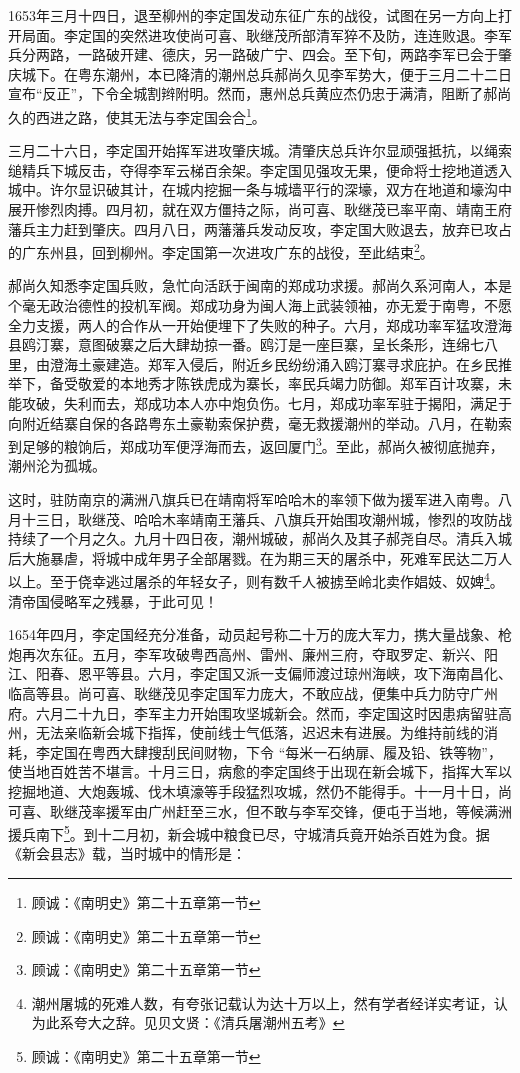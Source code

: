 1653年三月十四日，退至柳州的李定国发动东征广东的战役，试图在另一方向上打开局面。李定国的突然进攻使尚可喜、耿继茂所部清军猝不及防，连连败退。李军兵分两路，一路破开建、德庆，另一路破广宁、四会。至下旬，两路李军已会于肇庆城下。在粤东潮州，本已降清的潮州总兵郝尚久见李军势大，便于三月二十二日宣布“反正”，下令全城割辫附明。然而，惠州总兵黄应杰仍忠于满清，阻断了郝尚久的西进之路，使其无法与李定国会合\footnote{顾诚：《南明史》第二十五章第一节}。

三月二十六日，李定国开始挥军进攻肇庆城。清肇庆总兵许尔显顽强抵抗，以绳索缒精兵下城反击，夺得李军云梯百余架。李定国见强攻无果，便命将士挖地道透入城中。许尔显识破其计，在城内挖掘一条与城墙平行的深壕，双方在地道和壕沟中展开惨烈肉搏。四月初，就在双方僵持之际，尚可喜、耿继茂已率平南、靖南王府藩兵主力赶到肇庆。四月八日，两藩藩兵发动反攻，李定国大败退去，放弃已攻占的广东州县，回到柳州。李定国第一次进攻广东的战役，至此结束\footnote{顾诚：《南明史》第二十五章第一节}。

郝尚久知悉李定国兵败，急忙向活跃于闽南的郑成功求援。郝尚久系河南人，本是个毫无政治德性的投机军阀。郑成功身为闽人海上武装领袖，亦无爱于南粤，不愿全力支援，两人的合作从一开始便埋下了失败的种子。六月，郑成功率军猛攻澄海县鸥汀寨，意图破寨之后大肆劫掠一番。鸥汀是一座巨寨，呈长条形，连绵七八里，由澄海土豪建造。郑军入侵后，附近乡民纷纷涌入鸥汀寨寻求庇护。在乡民推举下，备受敬爱的本地秀才陈铁虎成为寨长，率民兵竭力防御。郑军百计攻寨，未能攻破，失利而去，郑成功本人亦中炮负伤。七月，郑成功率军驻于揭阳，满足于向附近结寨自保的各路粤东土豪勒索保护费，毫无救援潮州的举动。八月，在勒索到足够的粮饷后，郑成功军便浮海而去，返回厦门\footnote{顾诚：《南明史》第二十五章第一节}。至此，郝尚久被彻底抛弃，潮州沦为孤城。

这时，驻防南京的满洲八旗兵已在靖南将军哈哈木的率领下做为援军进入南粤。八月十三日，耿继茂、哈哈木率靖南王藩兵、八旗兵开始围攻潮州城，惨烈的攻防战持续了一个月之久。九月十四日夜，潮州城破，郝尚久及其子郝尧自尽。清兵入城后大施暴虐，将城中成年男子全部屠戮。在为期三天的屠杀中，死难军民达二万人以上。至于侥幸逃过屠杀的年轻女子，则有数千人被掳至岭北卖作娼妓、奴婢\footnote{潮州屠城的死难人数，有夸张记载认为达十万以上，然有学者经详实考证，认为此系夸大之辞。见贝文贤：《清兵屠潮州五考》}。清帝国侵略军之残暴，于此可见！

1654年四月，李定国经充分准备，动员起号称二十万的庞大军力，携大量战象、枪炮再次东征。五月，李军攻破粤西高州、雷州、廉州三府，夺取罗定、新兴、阳江、阳春、恩平等县。六月，李定国又派一支偏师渡过琼州海峡，攻下海南昌化、临高等县。尚可喜、耿继茂见李定国军力庞大，不敢应战，便集中兵力防守广州府。六月二十九日，李军主力开始围攻坚城新会。然而，李定国这时因患病留驻高州，无法亲临新会城下指挥，使前线士气低落，迟迟未有进展。为维持前线的消耗，李定国在粤西大肆搜刮民间财物，下令 “每米一石纳扉、履及铅、铁等物”，使当地百姓苦不堪言。十月三日，病愈的李定国终于出现在新会城下，指挥大军以挖掘地道、大炮轰城、伐木填濠等手段猛烈攻城，然仍不能得手。十一月十日，尚可喜、耿继茂率援军由广州赶至三水，但不敢与李军交锋，便屯于当地，等候满洲援兵南下\footnote{顾诚：《南明史》第二十五章第一节}。到十二月初，新会城中粮食已尽，守城清兵竟开始杀百姓为食。据《新会县志》载，当时城中的情形是：

